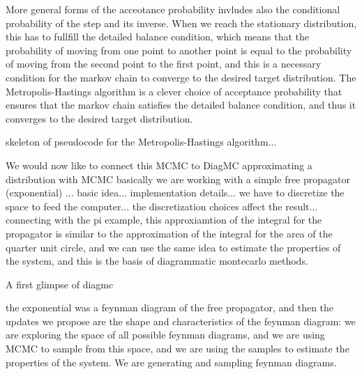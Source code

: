 More general forms of the acceotance probability invludes also the conditional probability of the step and its inverse. When we reach the stationary distribution, this has to fullfill the detailed balance condition, which means that the probability of moving from one point to another point is equal to the probability of moving from the second point to the first point, and this is a necessary condition for the markov chain to converge to the desired target distribution. The Metropolis-Hastings algorithm is a clever choice of acceptance probability that ensures that the markov chain satisfies the detailed balance condition, and thus it converges to the desired target distribution.

skeleton of pseudocode for the Metropolis-Hastings algorithm...

We would now like to connect this MCMC to DiagMC
approximating a distribution with MCMC
basically we are working with a simple free propagator (exponential) ... basic idea... implementation details...
we have to discretize the space to feed the computer... the discretization choices affect the result...
connecting with the pi example, this approxiamtion of the integral for the propagator is similar to the approximation of the integral for the area of the quarter unit circle, and we can use the same idea to estimate the properties of the system, and this is the basis of diagrammatic montecarlo methods.

A first glimpse of diagmc

the exponential was a feynman diagram of the free propagator, and then the updates we propose are the shape and characteristics of the feynman diagram: we are exploring the space of all possible feynman diagrams, and we are using MCMC to sample from this space, and we are using the samples to estimate the properties of the system. We are generating and sampling feynman diagrams.

